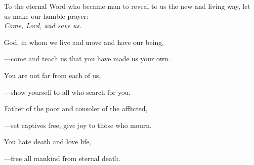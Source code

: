\intercessions\indent

\begin{hangpar}

To the eternal Word who became man to reveal to us the new and living way, let us make our humble prayer:\\
\emph{Come, Lord, and save us.}

\medskip God, in whom we live and move and have our being,

{\color{red}---\thinspace}come and teach us that you have made us your own.

\medskip You are not far from each of us,

{\color{red}---\thinspace}show yourself to all who search for you.

\medskip Father of the poor and consoler of the afflicted,

{\color{red}---\thinspace}set captives free, give joy to those who mourn.

\medskip You hate death and love life,

{\color{red}---\thinspace}free all mankind from eternal death.

\end{hangpar}
